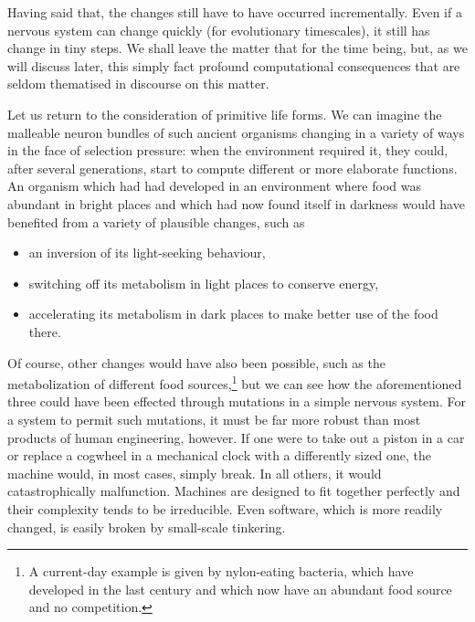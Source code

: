 Having said that, the changes still have to have occurred incrementally. Even if a nervous system can change quickly (for evolutionary timescales), it still has change in tiny steps. We shall leave the matter that for the time being, but, as we will discuss later, this simply fact profound computational consequences that are seldom thematised in discourse on this matter. 

Let us return to the consideration of primitive life forms. We can imagine the malleable neuron bundles of such ancient organisms changing in a variety of ways in the face of selection pressure: when the environment required it, they could, after several generations, start to compute different or more elaborate functions. An organism which had had developed in an environment where food was abundant in bright places and which had now found itself in darkness would have benefited from a variety of plausible changes, such as
\begin{itemize}
	\item an inversion of its light-seeking behaviour,
	\item switching off its metabolism in light places to conserve energy,
	\item accelerating its metabolism in dark places to make better use of the food there.
\end{itemize}

Of course, other changes would have also been possible, such as the metabolization of different food sources,\footnote{A current-day example is given by nylon-eating bacteria, which have developed in the last century and which now have an abundant food source and no competition.} but we can see how the aforementioned three could have been effected through mutations in a simple nervous system. For a system to permit such mutations, it must be far more robust than most products of human engineering, however. If one were to take out a piston in a car or replace a cogwheel in a mechanical clock with a differently sized one, the machine would, in most cases, simply break. In all others, it would catastrophically malfunction. Machines are designed to fit together perfectly and their complexity tends to be irreducible. Even software, which is more readily changed, is easily broken by small-scale tinkering.

